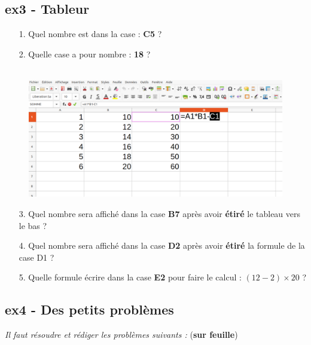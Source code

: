 \documentclass[11pt]{article}
\begin{document}
\begin{minipage}[t]{0.45\textwidth}
  \subsection*{ex3 - Tableur}

  \begin{enumerate}
    \item[1.] Quel nombre est dans la case : \textbf{C5} ? \dotfill
    \item[2.] Quelle case a pour nombre : \textbf{18} ? \dotfill
  \end{enumerate}

\end{minipage}
\begin{minipage}[t]{0.5\textwidth}

  \begin{figure}[H]
        \centering
        \includegraphics[width=\linewidth]{4x2-proportionnalite/ie-tableur.png}
  \end{figure}

\end{minipage}

\begin{enumerate}
  \item[3.] Quel nombre sera affiché dans la case \textbf{B7} après avoir \textbf{étiré} le tableau vers le bas ? \dotfill
  \item[4.] Quel nombre sera affiché dans la case \textbf{D2} après avoir \textbf{étiré} la formule de la case D1 ? \dotfill
  \item[5.] Quelle formule écrire dans la case \textbf{E2} pour faire le calcul : $(12-2) \times 20$ ? \dotfill
\end{enumerate}

\newpage

\subsection*{ex4 - Des petits problèmes}
\textit{Il faut résoudre et rédiger les problèmes suivants :} (\textbf{sur feuille})
\end{document}
